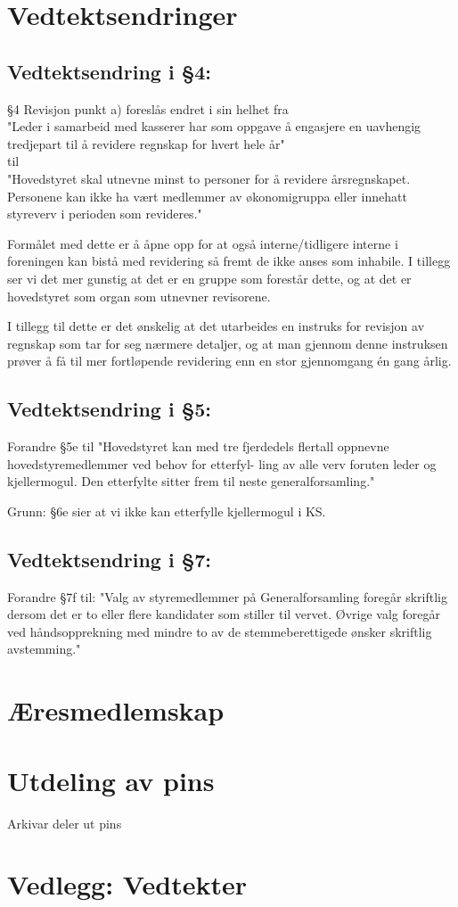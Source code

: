 \documentclass[10pt,norsk,a4paper]{article}
\begin{document}
\newpage

\section{Vedtektsendringer}

\subsection{Vedtektsendring i §4:}
​§4 Revisjon punkt a) foreslås endret i sin helhet fra\\
"Leder i samarbeid med kasserer har som oppgave å engasjere en uavhengig tredjepart til å revidere regnskap for hvert hele år​"\\
til\\
"Hovedstyret skal utnevne minst to personer for å revidere årsregnskapet. Personene kan ikke ha vært medlemmer av økonomigruppa eller innehatt styreverv i perioden som revideres."

Formålet med dette er å åpne opp for at også interne/tidligere interne i foreningen kan bistå med revidering så fremt de ikke anses som inhabile. I tillegg ser vi det mer gunstig at det er en gruppe som forestår dette, og at det er hovedstyret som organ som utnevner revisorene.

I tillegg til dette er det ønskelig at det utarbeides en instruks for revisjon av regnskap som tar for seg nærmere detaljer, og at man gjennom denne instruksen prøver å få til mer fortløpende revidering enn en stor gjennomgang én gang årlig.

\subsection{Vedtektsendring i §5:}
Forandre §5e til "Hovedstyret kan med tre fjerdedels flertall oppnevne
hovedstyremedlemmer ved behov for etterfyl-
ling av alle verv foruten leder og kjellermogul. Den etterfylte sitter
frem til neste generalforsamling."

Grunn: §6e sier at vi ikke kan etterfylle kjellermogul i KS.

\subsection{Vedtektsendring i §7:}
Forandre §7f til: 
"Valg av styremedlemmer på Generalforsamling foregår skriftlig dersom det er to eller flere kandidater som stiller til vervet. Øvrige valg foregår ved håndsopprekning med mindre to av de stemmeberettigede ønsker skriftlig avstemming." 


\section{Æresmedlemskap}

\section{Utdeling av pins}
Arkivar deler ut pins\\

\section*{Vedlegg: Vedtekter}

\newpage


\end{document}
